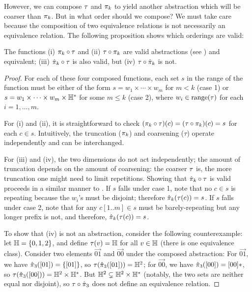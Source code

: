 However, we can compose $\tau$ and $\pi_k$ to yield another abstraction which will be coarser than $\pi_k$.
But in what order should we compose?
We must take care because the composition of two equivalence relations is not necessarily an equivalence relation.
The following proposition shows which orderings are valid:
\begin{proposition}
The functions
(i) $\pi_k \circ \tau$ and (ii) $\tau \circ \pi_k$
are valid abstractions (see ) and equivalent;
(iii) $\hat{\pi}_k \circ \tau$ is also valid,
but (iv) $\tau \circ \hat{\pi}_k$ is not.
\end{proposition}
\begin{proof}
For each of these four composed functions, each set $s$ in the range of the function
must be either of the form $s = w_1 \times \cdots \times w_m$ for $m < k$ (case 1)
or $s = w_1 \times \cdots \times w_m \times {\mathbb H}^*$ for some $m \le k$ (case 2),
where $w_i \in \text{range}(\tau)$ for each $i = 1, \dots, m$.

For (i) and (ii), it is straightforward to check
$(\pi_k \circ \tau)(c) = (\tau \circ \pi_k)(c) = s$ for each $c \in s$.
Intuitively, the truncation ($\pi_k$) and coarsening ($\tau$) operate
independently and can be interchanged.

For (iii) and (iv), the two dimensions do not act independently;
the amount of truncation depends on the amount of coarsening:
the coarser $\tau$ is, the more truncation one might need to limit repetitions.
Showing that $\hat{\pi}_k \circ \tau$ is valid
proceeds in a similar manner to .
If $s$ falls under case 1, note that no $c \in s$ is repeating
because the $w_i$'s must be disjoint; therefore $\hat{\pi}_k(\tau(c)) = s$.
If $s$ falls under case 2, note that for any $c[1..m] \in s$ must be barely-repeating but any longer prefix is not,
and therefore, $\hat{\pi}_k(\tau(c)) = s$.

To show that (iv) is not an abstraction,
consider the following counterexample:
let ${\mathbb H} = \{ 0,1,2 \}$,
and define $\tau(v) = {\mathbb H}$ for all $v \in {\mathbb H}$
(there is one equivalence class).
Consider two elements $\vec{01}$ and $\vec{00}$ under the composed abstraction:
For $\vec{01}$, we have $\hat{\pi}_3([01]) = \{ [01 ]\}$,
so $\tau(\hat{\pi}_3([01])) = {\mathbb H}^2$;
for $\vec{00}$, we have $\hat{\pi}_3([00]) = [00]*$,
so $\tau(\hat{\pi}_3([00])) = {\mathbb H}^2 \times {\mathbb H}^*$.
But ${\mathbb H}^2 \subsetneq {\mathbb H}^2 \times {\mathbb H}^*$ (notably,
the two sets are neither equal nor disjoint),
so $\tau \circ \hat{\pi}_3$ does not define an equivalence relation.
\end{proof}


